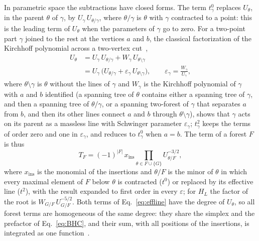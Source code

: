In parametric space the subtractions have closed forms. The term $t^0_\gamma$ replaces $U_\theta$, in the parent $\theta$ of
$\gamma$, by $U_\gamma\,U_{\theta/\gamma}$, where $\theta/\gamma$ is $\theta$ with $\gamma$ contracted to a point: this is the
leading term of $U_\theta$ when the parameters of $\gamma$ go to zero. For a two-point part $\gamma$ joined to the rest at
the vertices $a$ and $b$, the classical factorization of the Kirchhoff polynomial across a two-vertex
cut~\cite{Nakanishi1971,BognerWeinzierl2010},
\begin{align}
U_\theta&=U_\gamma\,U_{\theta/\gamma}+W_\gamma\,U_{\theta\setminus\gamma}\nonumber\\
&=U_\gamma\,\bigl(U_{\theta/\gamma}+\varepsilon_\gamma\,U_{\theta\setminus\gamma}\bigr),\qquad
\varepsilon_\gamma=\frac{W_\gamma}{U_\gamma},
\label{eq:effline}
\end{align}
where $\theta\setminus\gamma$ is $\theta$ without the lines of $\gamma$ and $W_\gamma$ is the Kirchhoff polynomial of $\gamma$
with $a$ and $b$ identified (a spanning tree of $\theta$ contains either a spanning tree of $\gamma$, and then a
spanning tree of $\theta/\gamma$, or a spanning two-forest of $\gamma$ that separates $a$ from $b$, and then its other
lines connect $a$ and $b$ through $\theta\setminus\gamma$), shows that $\gamma$ acts on its parent as a massless line
with Schwinger parameter
$\varepsilon_\gamma$; $t^2_\gamma$ keeps the terms of order zero and one in $\varepsilon_\gamma$, and reduces to
$t^0_\gamma$ when $a=b$. The term of a forest $F$ is thus
\begin{equation}
T_F=(-1)^{|F|}\,x_{\mathrm{ins}}\prod_{\theta\in F\cup\{G\}}U_{\theta/F}^{-3/2},
\label{eq:forestterm}
\end{equation}
where $x_{\mathrm{ins}}$ is the monomial of the insertions and $\theta/F$ is the minor of $\theta$ in which every maximal
element of $F$ below $\theta$ is contracted ($t^0$) or replaced by its effective line ($t^2$), with the result expanded to
first order in every $\varepsilon$; for $H_L$ the factor of the root is $W_{G/F}\,U_{G/F}^{-5/2}$. Both terms of
Eq.~\eqref{eq:effline} have the degree of $U_\theta$, so all forest terms are homogeneous of the same degree: they share
the simplex and the prefactor of Eq.~\eqref{eq:BHC}, and their sum, with all positions of the insertions, is integrated
as one function~\cite{BrownKreimer2013}.




